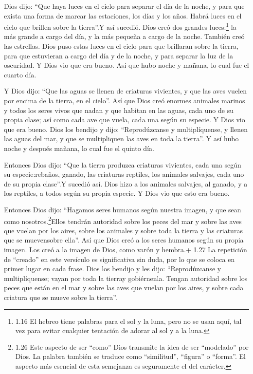  Dios dijo: ``Que haya luces en el cielo para separar el
día de la noche, y para que exista una forma de marcar las estaciones,
los días y los años.  Habrá luces en el cielo que brillen
sobre la tierra''.Y así sucedió.  Dios creó dos grandes
luces:\footnote{1.16 El hebreo tiene palabras para el sol y la luna,
  pero no se usan aquí, tal vez para evitar cualquier tentación de
  adorar al sol y a la luna.} la más grande a cargo del día, y la más
pequeña a cargo de la noche. También creó las estrellas. 
Dios puso estas luces en el cielo para que brillaran sobre la tierra,
 para que estuvieran a cargo del día y de la noche, y para
separar la luz de la oscuridad. Y Dios vio que era bueno. 
Así que hubo noche y mañana, lo cual fue el cuarto día.

 Y Dios dijo: ``Que las aguas se llenen de criaturas
vivientes, y que las aves vuelen por encima de la tierra, en el cielo''.
 Así que Dios creó enormes animales marinos y todos los
seres vivos que nadan y que habitan en las aguas, cada uno de su propia
clase; así como cada ave que vuela, cada una según su especie. Y Dios
vio que era bueno.  Dios los bendijo y dijo:
``Reprodúzcanse y multiplíquense, y llenen las aguas del mar, y que se
multipliquen las aves en toda la tierra''.  Y así hubo
noche y después mañana, lo cual fue el quinto día.

 Entonces Dios dijo: ``Que la tierra produzca criaturas
vivientes, cada una según su especie:rebaños, ganado, las criaturas
reptiles, los animales salvajes, cada uno de su propia clase''.Y sucedió
así.  Dios hizo a los animales salvajes, al ganado, y a los
reptiles, a todos según su propia especie. Y Dios vio que esto era
bueno.

 Entonces Dios dijo: ``Hagamos seres humanos según nuestra
imagen, y que sean como nosotros.\footnote{1.26 Este aspecto de ser
  ``como'' Dios transmite la idea de ser ``modelado'' por Dios. La
  palabra también se traduce como ``similitud'', ``figura'' o ``forma''.
  El aspecto más esencial de esta semejanza es seguramente el del
  carácter.}Ellos tendrán autoridad sobre los peces del mar y sobre las
aves que vuelan por los aires, sobre los animales y sobre toda la tierra
y las criaturas que se muevensobre ella''.  Así que Dios
creó a los seres humanos según su propia imagen. Los creó a la imagen de
Dios, como varón y hembra.+ 1.27 La repetición de ``creado'' en este
versículo es significativa sin duda, por lo que se coloca en primer
lugar en cada frase.  Dios los bendijo y les dijo:
``Reprodúzcanse y multiplíquense; vayan por toda la tierray gobiérnenla.
Tengan autoridad sobre los peces que están en el mar y sobre las aves
que vuelan por los aires, y sobre cada criatura que se mueve sobre la
tierra''.

